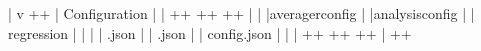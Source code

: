 \documentclass[a4paper,11pt,english,openany,oneside]{sphinxmanual}
\begin{document}
\begin{sphinxVerbatim}[commandchars=\\\{\}]
                               |
                               v
+\PYGZhy{}\PYGZhy{}\PYGZhy{}\PYGZhy{}\PYGZhy{}\PYGZhy{}\PYGZhy{}\PYGZhy{}\PYGZhy{}\PYGZhy{}\PYGZhy{}\PYGZhy{}\PYGZhy{}\PYGZhy{}\PYGZhy{}\PYGZhy{}\PYGZhy{}\PYGZhy{}\PYGZhy{}\PYGZhy{}\PYGZhy{}\PYGZhy{}\PYGZhy{}\PYGZhy{}\PYGZhy{}\PYGZhy{}\PYGZhy{}\PYGZhy{}\PYGZhy{}\PYGZhy{}\PYGZhy{}\PYGZhy{}\PYGZhy{}\PYGZhy{}\PYGZhy{}\PYGZhy{}\PYGZhy{}\PYGZhy{}\PYGZhy{}\PYGZhy{}\PYGZhy{}\PYGZhy{}\PYGZhy{}\PYGZhy{}\PYGZhy{}\PYGZhy{}\PYGZhy{}\PYGZhy{}\PYGZhy{}\PYGZhy{}\PYGZhy{}\PYGZhy{}\PYGZhy{}\PYGZhy{}\PYGZhy{}\PYGZhy{}\PYGZhy{}\PYGZhy{}\PYGZhy{}\PYGZhy{}\PYGZhy{}+
|                    Configuration                            |
|  +\PYGZhy{}\PYGZhy{}\PYGZhy{}\PYGZhy{}\PYGZhy{}\PYGZhy{}\PYGZhy{}\PYGZhy{}\PYGZhy{}\PYGZhy{}\PYGZhy{}\PYGZhy{}\PYGZhy{}\PYGZhy{}\PYGZhy{}\PYGZhy{}+  +\PYGZhy{}\PYGZhy{}\PYGZhy{}\PYGZhy{}\PYGZhy{}\PYGZhy{}\PYGZhy{}\PYGZhy{}\PYGZhy{}\PYGZhy{}\PYGZhy{}\PYGZhy{}\PYGZhy{}\PYGZhy{}\PYGZhy{}\PYGZhy{}+  +\PYGZhy{}\PYGZhy{}\PYGZhy{}\PYGZhy{}\PYGZhy{}\PYGZhy{}\PYGZhy{}\PYGZhy{}\PYGZhy{}\PYGZhy{}\PYGZhy{}\PYGZhy{}\PYGZhy{}\PYGZhy{}\PYGZhy{}+  |
|  |averager\PYGZus{}config |  |analysis\PYGZus{}config |  | regression\PYGZus{}   |  |
|  |     .json      |  |     .json      |  |  config.json  |  |
|  +\PYGZhy{}\PYGZhy{}\PYGZhy{}\PYGZhy{}\PYGZhy{}\PYGZhy{}\PYGZhy{}\PYGZhy{}\PYGZhy{}\PYGZhy{}\PYGZhy{}\PYGZhy{}\PYGZhy{}\PYGZhy{}\PYGZhy{}\PYGZhy{}+  +\PYGZhy{}\PYGZhy{}\PYGZhy{}\PYGZhy{}\PYGZhy{}\PYGZhy{}\PYGZhy{}\PYGZhy{}\PYGZhy{}\PYGZhy{}\PYGZhy{}\PYGZhy{}\PYGZhy{}\PYGZhy{}\PYGZhy{}\PYGZhy{}+  +\PYGZhy{}\PYGZhy{}\PYGZhy{}\PYGZhy{}\PYGZhy{}\PYGZhy{}\PYGZhy{}\PYGZhy{}\PYGZhy{}\PYGZhy{}\PYGZhy{}\PYGZhy{}\PYGZhy{}\PYGZhy{}\PYGZhy{}+  |
+\PYGZhy{}\PYGZhy{}\PYGZhy{}\PYGZhy{}\PYGZhy{}\PYGZhy{}\PYGZhy{}\PYGZhy{}\PYGZhy{}\PYGZhy{}\PYGZhy{}\PYGZhy{}\PYGZhy{}\PYGZhy{}\PYGZhy{}\PYGZhy{}\PYGZhy{}\PYGZhy{}\PYGZhy{}\PYGZhy{}\PYGZhy{}\PYGZhy{}\PYGZhy{}\PYGZhy{}\PYGZhy{}\PYGZhy{}\PYGZhy{}\PYGZhy{}\PYGZhy{}\PYGZhy{}\PYGZhy{}\PYGZhy{}\PYGZhy{}\PYGZhy{}\PYGZhy{}\PYGZhy{}\PYGZhy{}\PYGZhy{}\PYGZhy{}\PYGZhy{}\PYGZhy{}\PYGZhy{}\PYGZhy{}\PYGZhy{}\PYGZhy{}\PYGZhy{}\PYGZhy{}\PYGZhy{}\PYGZhy{}\PYGZhy{}\PYGZhy{}\PYGZhy{}\PYGZhy{}\PYGZhy{}\PYGZhy{}\PYGZhy{}\PYGZhy{}\PYGZhy{}\PYGZhy{}\PYGZhy{}\PYGZhy{}+
\end{sphinxVerbatim}
\end{document}
